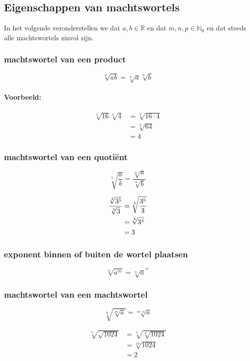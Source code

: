 \documentclass[12pt,twoside,a4paper]{article}
\begin{document}
\subsection{Eigenschappen van machtswortels}
In het volgende veronderstellen we dat $a, b \in\mathbb{R}$ en dat $m,n,p\in\mathbb{N}_0$ en dat steeds alle machtswortels zinvol zijn.

\subsubsection*{machtswortel van een product}
\begin{mdframed}
  $$\sqrt[n]{ab} = \sqrt[n]{a}\sqrt[n]{b}$$
\end{mdframed}
\paragraph{Voorbeeld:}
\begin{align*}
  \sqrt[3]{16}\sqrt[3]{4} &= \sqrt[3]{16 \cdot 4}\\
                          &= \sqrt[3]{64}\\
                          &= 4
\end{align*}

\needspace{3cm}
\subsubsection*{machtswortel van een quotiënt}
\begin{mdframed}
$$\sqrt[n]{\dfrac{a}{b}} = \dfrac{\sqrt[n]{a}}{\sqrt[n]{b}}$$
\end{mdframed}
\begin{align*}
  {\sqrt[4]{3^5} \over \sqrt[4]{3}} &= \sqrt[4]{3^5 \over 3}\\
                                    &= \sqrt[4]{3^4}\\
                                    &= 3
\end{align*}

\subsubsection*{exponent binnen of buiten de wortel plaatsen}
\begin{mdframed}
$$\sqrt[n]{a^m} = \sqrt[n]{a}^{^m}$$
\end{mdframed}

\subsubsection*{machtswortel van een machtswortel}
\begin{mdframed}
$$\sqrt[n]{\sqrt[m]{a}} = \sqrt[m\cdot n]{a}$$
\end{mdframed}
\begin{align*}
  \sqrt[5]{\sqrt{1024}} &= \sqrt[5]{\sqrt[2]{1024}}\\
                        &= \sqrt[10]{1024}\\
                        &= 2
\end{align*}
\end{document}
